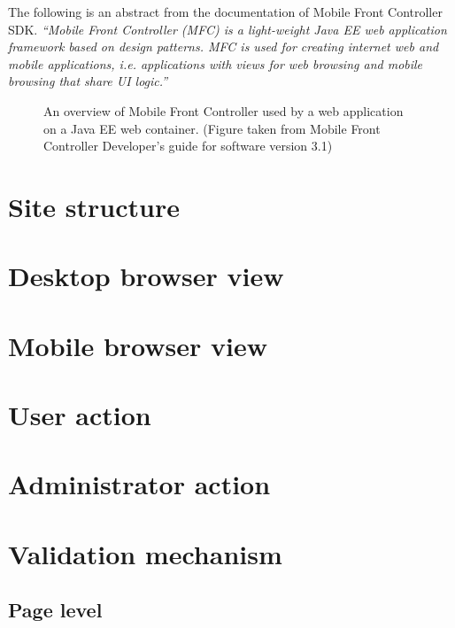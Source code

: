 The following is an abstract from the documentation of Mobile Front Controller SDK. \textit{``Mobile Front Controller (MFC) is a light-weight Java EE web application framework based on design patterns. MFC is used for creating internet web and mobile applications, i.e. applications with views for web browsing and mobile browsing that share UI logic.''}\cite{MobileFrontController} 

\begin{figure}[!hbtp]
\centering
{}
\caption{An overview of Mobile Front Controller used by a web application on a
Java EE web container. (Figure taken from Mobile Front Controller Developer's guide for software version 3.1\cite{DevelopersGuideOfMFC})}
\label{fig:MFCOverview}
\end{figure} 



\section{Site structure}
\label{sec:WebApplication:SiteStructure}

\section{Desktop browser view}
\label{sec:WebApplication:DesktopBrowserView}

\section{Mobile browser view}
\label{sec:WebApplication:MobileBrowserView}

\section{User action}
\label{sec:WebApplication:UserAction}

\section{Administrator action}
\label{sec:WebApplication:AdministratorAction}

\section{Validation mechanism}
\label{sec:WebApplication:ValidationMechanism}

\subsection{Page level}
\label{sec:WebApplication:ValidationMechanism:PageLevel}

